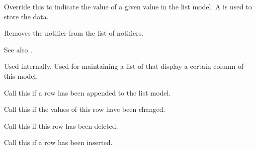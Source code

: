 \label{wxdataviewlistmodelgetvalue}


Override this to indicate the value of a given value
in the list model. A 
is used to store the data.

\label{wxdataviewlistmodelremovenotifier}


Removes the notifier from the list of notifiers.

See also .

\label{wxdataviewlistmodelremoveviewingcolumn}


Used internally. Used for maintaining a list of
 that
display a certain column of this model.

\label{wxdataviewlistmodelrowappended}


Call this if a row has been appended to the list model.

\label{wxdataviewlistmodelrowchanged}


Call this if the values of this row have been changed.

\label{wxdataviewlistmodelrowdeleted}


Call this if this row has been deleted.

\label{wxdataviewlistmodelrowinserted}


Call this if a row has been inserted.

\label{wxdataviewlistmodelrowprepended}

